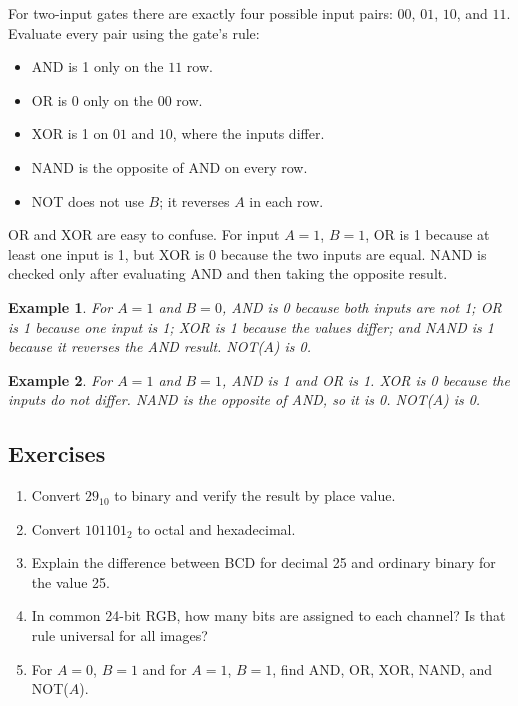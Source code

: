 \documentclass[11pt]{article}
\newtheorem{example}{Example}[section]
\begin{document}
For two-input gates there are exactly four possible input pairs:
$00$, $01$, $10$, and $11$. Evaluate every pair using the gate's rule:
\begin{itemize}
  \item AND is 1 only on the $11$ row.
  \item OR is 0 only on the $00$ row.
  \item XOR is 1 on $01$ and $10$, where the inputs differ.
  \item NAND is the opposite of AND on every row.
  \item NOT does not use $B$; it reverses $A$ in each row.
\end{itemize}
OR and XOR are easy to confuse. For input $A=1$, $B=1$, OR is 1 because
at least one input is 1, but XOR is 0 because the two inputs are equal.
NAND is checked only after evaluating AND and then taking the opposite
result.

\begin{example}
For $A=1$ and $B=0$, AND is 0 because both inputs are not 1; OR is 1
because one input is 1; XOR is 1 because the values differ; and NAND is 1
because it reverses the AND result. NOT($A$) is 0.
\end{example}

\begin{example}
For $A=1$ and $B=1$, AND is 1 and OR is 1. XOR is 0 because the inputs do
not differ. NAND is the opposite of AND, so it is 0. NOT($A$) is 0.
\end{example}

\subsection*{Exercises}
\begin{enumerate}[label=\arabic*.]
  \item Convert $29_{10}$ to binary and verify the result by place value.
  \item Convert $101101_2$ to octal and hexadecimal.
  \item Explain the difference between BCD for decimal 25 and ordinary
    binary for the value 25.
  \item In common 24-bit RGB, how many bits are assigned to each channel?
    Is that rule universal for all images?
  \item For $A=0$, $B=1$ and for $A=1$, $B=1$, find AND, OR, XOR, NAND,
    and NOT($A$).
\end{enumerate}
\end{document}
